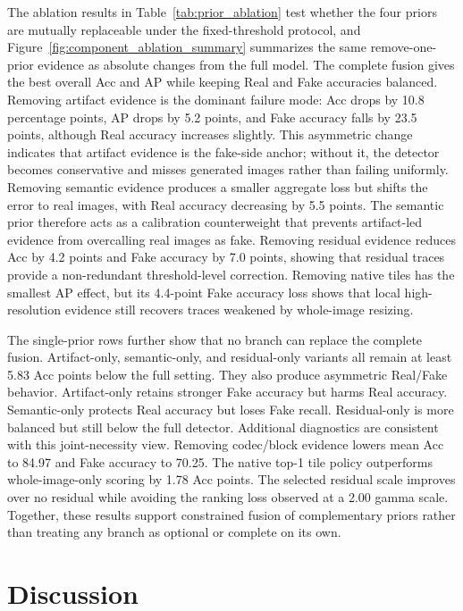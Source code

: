 \documentclass[lettersize,journal]{IEEEtran}
\begin{document}
The ablation results in Table~\ref{tab:prior_ablation} test whether the four priors are mutually replaceable under the fixed-threshold protocol, and Figure~\ref{fig:component_ablation_summary} summarizes the same remove-one-prior evidence as absolute changes from the full model. The complete fusion gives the best overall Acc and AP while keeping Real and Fake accuracies balanced. Removing artifact evidence is the dominant failure mode: Acc drops by 10.8 percentage points, AP drops by 5.2 points, and Fake accuracy falls by 23.5 points, although Real accuracy increases slightly. This asymmetric change indicates that artifact evidence is the fake-side anchor; without it, the detector becomes conservative and misses generated images rather than failing uniformly. Removing semantic evidence produces a smaller aggregate loss but shifts the error to real images, with Real accuracy decreasing by 5.5 points. The semantic prior therefore acts as a calibration counterweight that prevents artifact-led evidence from overcalling real images as fake. Removing residual evidence reduces Acc by 4.2 points and Fake accuracy by 7.0 points, showing that residual traces provide a non-redundant threshold-level correction. Removing native tiles has the smallest AP effect, but its 4.4-point Fake accuracy loss shows that local high-resolution evidence still recovers traces weakened by whole-image resizing.

The single-prior rows further show that no branch can replace the complete fusion. Artifact-only, semantic-only, and residual-only variants all remain at least 5.83 Acc points below the full setting. They also produce asymmetric Real/Fake behavior. Artifact-only retains stronger Fake accuracy but harms Real accuracy. Semantic-only protects Real accuracy but loses Fake recall. Residual-only is more balanced but still below the full detector. Additional diagnostics are consistent with this joint-necessity view. Removing codec/block evidence lowers mean Acc to 84.97 and Fake accuracy to 70.25. The native top-1 tile policy outperforms whole-image-only scoring by 1.78 Acc points. The selected residual scale improves over no residual while avoiding the ranking loss observed at a 2.00 gamma scale. Together, these results support constrained fusion of complementary priors rather than treating any branch as optional or complete on its own.

\section{Discussion}
\label{sec:discussion}
\end{document}
